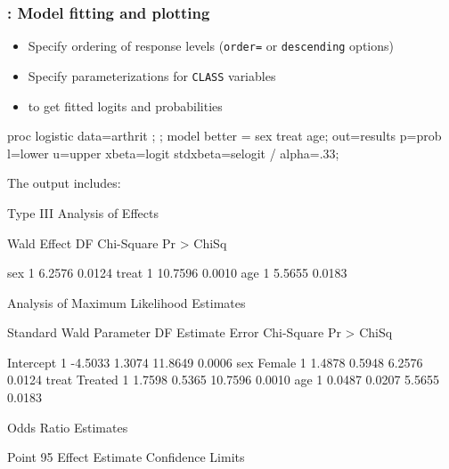 \begin{frame}[fragile]
  \frametitle{: Model fitting and plotting}
  \begin{itemize}
	\item Specify ordering of response levels (\texttt{order=} or \texttt{descending} options)
	\item Specify parameterizations for \texttt{CLASS} variables
	\item {} to get fitted logits and probabilities
  \end{itemize}
  \vspace{1ex}
\begin{Input}[label=\fbox{\texttt{glogist1c.sas} $\cdots$},baselinestretch=0.7]
\vspace{.2ex}
proc logistic data=arthrit ;
   ;
   model better = sex  treat  age;
    out=results 
          p=prob l=lower u=upper
          xbeta=logit stdxbeta=selogit / alpha=.33;
\end{Input}
The output includes:
\begin{Output}[gobble=5,fontsize=\small]
                    Type III Analysis of Effects
 
                                     Wald
             Effect      DF    Chi-Square    Pr > ChiSq

             sex          1        6.2576        0.0124
             treat        1       10.7596        0.0010
             age          1        5.5655        0.0183
\end{Output}
\begin{Output}[gobble=1,fontsize=\footnotesize]
             Analysis of Maximum Likelihood Estimates
 
                                  Standard        Wald
 Parameter          DF  Estimate     Error  Chi-Square  Pr > ChiSq

 Intercept           1   -4.5033    1.3074     11.8649      0.0006
 sex       Female    1    1.4878    0.5948      6.2576      0.0124
 treat     Treated   1    1.7598    0.5365     10.7596      0.0010
 age                 1    0.0487    0.0207      5.5655      0.0183

                        Odds Ratio Estimates
                                  
                                   Point          95%
    Effect                      Estimate      Confidence Limits


\end{Output}
\end{frame}
